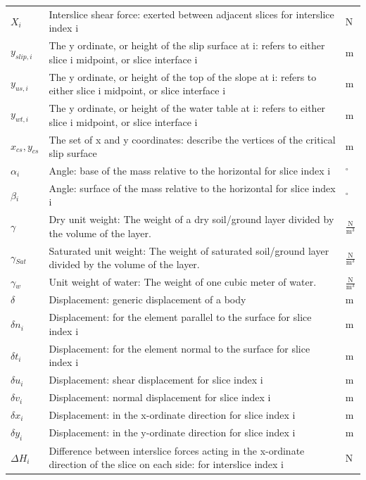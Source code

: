 \documentclass[12pt]{article}
\begin{document}
\begin{longtable*}{l l l}
\\
$X_{i}$ & Interslice shear force: exerted between adjacent slices for interslice index i & N
\\
$y_{slip,i}$ & The y ordinate, or height of the slip surface at i: refers to either slice i midpoint, or slice interface i & m
\\
$y_{us,i}$ & The y ordinate, or height of the top of the slope at i: refers to either slice i midpoint, or slice interface i & m
\\
$y_{wt,i}$ & The y ordinate, or height of the water table at i: refers to either slice i midpoint, or slice interface i & m
\\
${x_{cs},y_{cs}}$ & The set of x and y coordinates: describe the vertices of the critical slip surface & m
\\
$\alpha{}_{i}$ & Angle: base of the mass relative to the horizontal for slice index i & ${}^{\circ}$
\\
$\beta{}_{i}$ & Angle: surface of the mass relative to the horizontal for slice index i & ${}^{\circ}$
\\
$\gamma{}$ & Dry unit weight: The weight of a dry soil/ground layer divided by the volume of the layer. & $\frac{\text{N}}{\text{m}^{3}}$
\\
$\gamma{}_{Sat}$ & Saturated unit weight: The weight of saturated soil/ground layer divided by the volume of the layer. & $\frac{\text{N}}{\text{m}^{3}}$
\\
$\gamma{}_{w}$ & Unit weight of water: The weight of one cubic meter of water. & $\frac{\text{N}}{\text{m}^{3}}$
\\
$\delta{}$ & Displacement: generic displacement of a body & m
\\
$\delta{}n_{i}$ & Displacement: for the element parallel to the surface for slice index i & m
\\
$\delta{}t_{i}$ & Displacement: for the element normal to the surface for slice index i & m
\\
$\delta{}u_{i}$ & Displacement: shear displacement for slice index i & m
\\
$\delta{}v_{i}$ & Displacement: normal displacement for slice index i & m
\\
$\delta{}x_{i}$ & Displacement: in the x-ordinate direction for slice index i & m
\\
$\delta{}y_{i}$ & Displacement: in the y-ordinate direction for slice index i & m
\\
$\Delta{}H_{i}$ & Difference between interslice forces acting in the x-ordinate direction of the slice on each side: for interslice index i & N

\end{longtable*}
\end{document}
